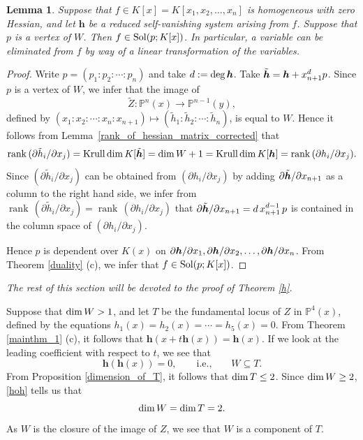 \documentclass[12pt]{article}
\newtheorem{lemma}[theorem]{Lemma}
\theoremstyle{definition}
\theoremstyle{remark}
\def\dim{{\rm dim}}
\def\deg{{\rm deg}}
\def\sol{{\rm Sol}}
\def\boldh{\mbox{\boldmath $h$}}
\def\pa{\partial}
\newcommand {\PP}{\mathbb{P}}
\def\rk{\operatorname{rank}}
\def\krdim{\operatorname{Krull\,dim}}
\begin{document}
\begin{lemma} \label{B}
Suppose that $f \in K[x] = K[x_1,x_2,\ldots,x_n]$ is homogeneous with zero Hessian, 
and let $\bm{h}$ be a reduced self-vanishing system arising from $f$. Suppose that 
$p$ is a vertex of $W$. Then $f \in \sol(p; K[x])$. In particular, a variable can be 
eliminated from $f$ by way of a linear transformation of the variables.
\end{lemma}

\begin{proof}
Write $p = (p_1 : p_2 : \cdots : p_n)$ and take $d := \deg\, \boldh$.
Take $\tilde{\boldh} = \boldh + x_{n+1}^d p$. Since $p$ is a vertex of $W$, 
we infer that the image of 
$$
\tilde{Z} : \PP^n(x) \rightarrow \PP^{n-1}(y),
$$
defined by $(x_1 : x_2 : \cdots : x_n : x_{n+1}) \mapsto 
(\tilde{h}_1 : \tilde{h}_2 : \cdots : \tilde{h}_n)$, is equal to $W$.
Hence it follows from Lemma~\ref{rank_of_hessian_matrix_corrected} that  
$$
\rk\, (\pa \tilde{h}_i / \pa x_j) = \krdim K[\tilde{\boldh}] = 
\dim\, W + 1 = \krdim K[\boldh] = \rk\, (\pa h_i / \pa x_j).
$$
Since $(\pa \tilde{h}_i / \pa x_j)$ can be obtained from $(\pa h_i / \pa x_j)$
by adding $\pa \tilde{\boldh} / \pa x_{n+1}$ as a column to the right hand side,
we infer from $\rk\, (\pa \tilde{h}_i / \pa x_j) = \rk\, (\pa h_i / \pa x_j)$ that
$\pa \tilde{\boldh} / \pa x_{n+1} = d\,x_{n+1}^{d-1}\,p$ is contained in the column 
space of $(\pa h_i / \pa x_j)$. 

Hence $p$ is dependent over $K(x)$ on
$\pa \boldh / \pa x_1, \pa \boldh / \pa x_2, \ldots, \pa \boldh / \pa x_n$. 
From Theorem \ref{duality} (c), we infer that $f \in \sol(p; K[x])$.
\end{proof}

\emph{The rest of this section will be devoted to the proof of Theorem \ref{h}.}

Suppose that $\dim\, W > 1$, and let $T$ be the fundamental locus of $Z$ in $\PP^4(x)$, 
defined by the equations $h_1(x) = h_2(x) = \cdots = h_5(x) = 0$. 
From Theorem \ref{mainthm_1} (c), it follows that $\bm{h}(x+t\bm{h}(x)) = \bm{h}(x)$. 
If we look at the leading coefficient with respect to $t$, we see that 
\begin{equation} \label{hoh}
\bm{h}(\bm{h}(x)) = 0, \qquad \mbox{i.e.,} \qquad W \subseteq T.
\end{equation}
From Proposition \ref{dimension_of_T}, it follows that $\dim\, T \le 2$. Since 
$\dim\, W \ge 2$, \eqref{hoh} tells us that 
$$
\dim\, W = \dim\, T = 2.
$$
As $W$ is the closure of the image of $Z$, we see that $W$ is a component of $T$.
\end{document}
